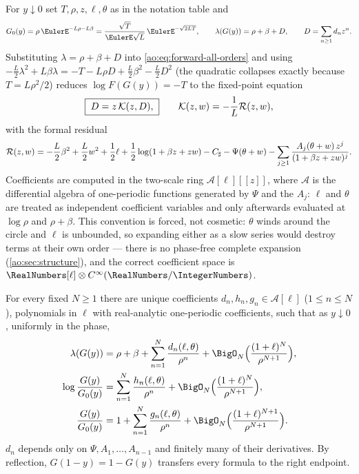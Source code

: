 For $y\downarrow0$ set
$T,\rho,z,\ell,\theta$ as in the notation table and
\begin{equation}
 \Gzero(y)=\rho\,\EulerE^{-L\rho-L\beta}
 =\frac{\sqrt T}{\EulerE\sqrt L}\,\EulerE^{-\sqrt{2LT}},
 \qquad
 \lambda(G(y))=\rho+\beta+D,
 \qquad
 D=\sum_{n\ge1}d_nz^{n}.
 \label{ao:eq:G0-D}
\end{equation}
Substituting $\lambda=\rho+\beta+D$ into
\eqref{ao:eq:forward-all-orders} and using
$-\tfrac L2\lambda^{2}+L\beta\lambda
=-T-L\rho D+\tfrac L2\beta^{2}-\tfrac L2D^{2}$ (the quadratic
collapses exactly because $T=L\rho^{2}/2$) reduces
$\log F(G(y))=-T$ to the fixed-point equation
\begin{equation}
 \boxed{\;D=z\,\mathcal K(z,D),\;}
 \qquad
 \mathcal K(z,w)=-\frac1L\mathcal R(z,w),
 \label{ao:eq:fixed-point}
\end{equation}
with the formal residual
\begin{equation}
 \mathcal R(z,w)=
 -\frac L2\beta^{2}+\frac L2w^{2}+\frac12\ell
 +\frac12\log(1+\beta z+zw)
 -C_{\sharp}-\Psi(\theta+w)
 -\sum_{j\ge1}\frac{A_j(\theta+w)\,z^{j}}{(1+\beta z+zw)^{j}}.
 \label{ao:eq:R-def}
\end{equation}
Coefficients are computed in the two-scale ring
$\mathscr A[\ell][[z]]$, where $\mathscr A$ is the differential
algebra of one-periodic functions generated by $\Psi$ and the $A_j$:
$\ell$ and $\theta$ are treated as independent coefficient variables
and only afterwards evaluated at $\log\rho$ and $\rho+\beta$.  This
convention is forced, not cosmetic: $\theta$ winds around the circle
and $\ell$ is unbounded, so expanding either as a slow series would
destroy terms at their own order --- there is no phase-free complete
expansion (\cref{ao:sec:structure}), and the correct coefficient space
is $\RealNumbers[\ell]\otimes C^\infty(\RealNumbers/\IntegerNumbers)$.

\begin{theorem}
\label{ao:thm:all-orders}
For every fixed $N\ge1$ there are unique coefficients
$d_n,h_n,g_n\in\mathscr A[\ell]$ ($1\le n\le N$), polynomials in
$\ell$ with real-analytic one-periodic coefficients, such that as
$y\downarrow0$, uniformly in the phase,
\begin{align}
 \lambda(G(y))
 &=\rho+\beta+\sum_{n=1}^{N}\frac{d_n(\ell,\theta)}{\rho^{n}}
 +\BigO_N\Bigl(\frac{(1+\ell)^{N}}{\rho^{N+1}}\Bigr),
 \label{ao:eq:phase-expansion}\\
 \log\frac{G(y)}{\Gzero(y)}
 &=\sum_{n=1}^{N}\frac{h_n(\ell,\theta)}{\rho^{n}}
 +\BigO_N\Bigl(\frac{(1+\ell)^{N}}{\rho^{N+1}}\Bigr),\notag\\
 \frac{G(y)}{\Gzero(y)}
 &=1+\sum_{n=1}^{N}\frac{g_n(\ell,\theta)}{\rho^{n}}
 +\BigO_N\Bigl(\frac{(1+\ell)^{N+1}}{\rho^{N+1}}\Bigr).
 \label{ao:eq:G-expansion}
\end{align}
$d_n$ depends only on $\Psi,A_1,\dots,A_{n-1}$ and finitely many of
their derivatives.  By reflection, $G(1-y)=1-G(y)$ transfers every
formula to the right endpoint.
\end{theorem}

